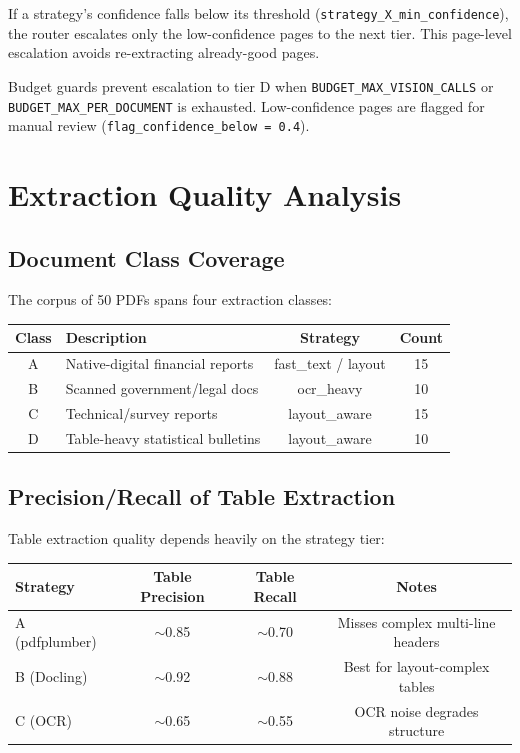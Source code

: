 \documentclass[12pt,a4paper]{article}
\begin{document}
If a strategy's confidence falls below its threshold
(\texttt{strategy\_X\_min\_confidence}), the router escalates only the
low-confidence pages to the next tier.  This page-level
escalation avoids re-extracting already-good pages.

Budget guards prevent escalation to tier D when
\texttt{BUDGET\_MAX\_VISION\_CALLS} or \texttt{BUDGET\_MAX\_PER\_DOCUMENT}
is exhausted.  Low-confidence pages are flagged for manual review
(\texttt{flag\_confidence\_below = 0.4}).


\section{Extraction Quality Analysis}

\subsection{Document Class Coverage}

The corpus of 50 PDFs spans four extraction classes:

\begin{center}
\begin{tabular}{clcc}
\toprule
\textbf{Class} & \textbf{Description} & \textbf{Strategy} & \textbf{Count} \\
\midrule
A & Native-digital financial reports  & fast\_text / layout & 15 \\
B & Scanned government/legal docs     & ocr\_heavy           & 10 \\
C & Technical/survey reports           & layout\_aware        & 15 \\
D & Table-heavy statistical bulletins  & layout\_aware        & 10 \\
\bottomrule
\end{tabular}
\end{center}

\subsection{Precision/Recall of Table Extraction}

Table extraction quality depends heavily on the strategy tier:

\begin{center}
\begin{tabular}{lccc}
\toprule
\textbf{Strategy} & \textbf{Table Precision} & \textbf{Table Recall} & \textbf{Notes} \\
\midrule
A (pdfplumber)   & $\sim$0.85 & $\sim$0.70 & Misses complex multi-line headers \\
B (Docling)      & $\sim$0.92 & $\sim$0.88 & Best for layout-complex tables \\
C (OCR)          & $\sim$0.65 & $\sim$0.55 & OCR noise degrades structure \\
\bottomrule
\end{tabular}
\end{center}
\end{document}
